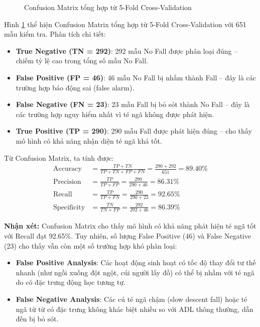 \begin{figure}[hbtp]
    \centering
    \caption[Confusion Matrix 5-Fold CV]{Confusion Matrix tổng hợp từ 5-Fold Cross-Validation}
    \label{fig:confusion_matrix_5fold}
\end{figure}

Hình \ref{fig:confusion_matrix_5fold} thể hiện Confusion Matrix tổng hợp từ 5-Fold Cross-Validation với 651 mẫu kiểm tra. Phân tích chi tiết:

\begin{itemize}
    \item \textbf{True Negative (TN = 292)}: 292 mẫu No Fall được phân loại đúng -- chiếm tỷ lệ cao trong tổng số mẫu No Fall.
    \item \textbf{False Positive (FP = 46)}: 46 mẫu No Fall bị nhầm thành Fall -- đây là các trường hợp báo động sai (false alarm).
    \item \textbf{False Negative (FN = 23)}: 23 mẫu Fall bị bỏ sót thành No Fall -- đây là các trường hợp nguy hiểm nhất vì té ngã không được phát hiện.
    \item \textbf{True Positive (TP = 290)}: 290 mẫu Fall được phát hiện đúng -- cho thấy mô hình có khả năng nhận diện té ngã khá tốt.
\end{itemize}

Từ Confusion Matrix, ta tính được:
\begin{align}
\text{Accuracy} &= \frac{TP + TN}{TP + TN + FP + FN} = \frac{290 + 292}{651} = 89.40\% \\
\text{Precision} &= \frac{TP}{TP + FP} = \frac{290}{290 + 46} = 86.31\% \\
\text{Recall} &= \frac{TP}{TP + FN} = \frac{290}{290 + 23} = 92.65\% \\
\text{Specificity} &= \frac{TN}{TN + FP} = \frac{292}{292 + 46} = 86.39\%
\end{align}

\textbf{Nhận xét:} Confusion Matrix cho thấy mô hình có khả năng phát hiện té ngã tốt với Recall đạt 92.65\%. Tuy nhiên, số lượng False Positive (46) và False Negative (23) cho thấy vẫn còn một số trường hợp khó phân loại:

\begin{itemize}
    \item \textbf{False Positive Analysis}: Các hoạt động sinh hoạt có tốc độ thay đổi tư thế nhanh (như ngồi xuống đột ngột, cúi người lấy đồ) có thể bị nhầm với té ngã do có đặc trưng động học tương tự.
    \item \textbf{False Negative Analysis}: Các cú té ngã chậm (slow descent fall) hoặc té ngã từ từ có đặc trưng không khác biệt nhiều so với ADL thông thường, dẫn đến bị bỏ sót.
\end{itemize}

